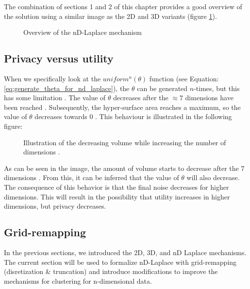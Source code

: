 The combination of sections 1 and 2 of this chapter provides a good overview of the solution using a similar image as the 2D and 3D variants (figure \ref{fig:nd-laplace-overview}).
\begin{figure}[H]
   \centering
  
  \caption{Overview of the nD-Laplace mechanism}
  \label{fig:nd-laplace-overview}
\end{figure}
\newpage
\subsection{Privacy versus utility} \label{theory:privacy-utility-nd}
When we specifically look at the \(uniform^n(\theta)\) function (see Equation: \ref{eq:generate_theta_for_nd_laplace}), the \(\theta\) can be generated \(n\)-times, but this has some limitation \citep{weisstein_hypersphere_nodate}.
The value of \(\theta\) decreases after the $\approx 7$ dimensions have been reached \citep{wells_penguin_1997}. Subsequently, the hyper-surface area reaches a maximum, so the value of $\theta$ decreases towards 0 \citep{weisstein_hypersphere_nodate}.
This behaviour is illustrated in the following figure:
\begin{figure}[H]
\centering
  
  \caption{Illustration of the decreasing volume while increasing the number of dimensions \citep{weisstein_hypersphere_nodate}.}
  \label{fig:curse-of-dimensionality}
\end{figure}
As can be seen in the image, the amount of volume starts to decrease after the 7 dimensions . From this, it can be inferred that the value of  $\theta$ will also decrease. 
The consequence of this behavior is that the final noise decreases for higher dimensions. This will result in the possibility that utility increases in higher dimensions, but privacy decreases.

\newpage
\subsection{Grid-remapping}
In the previous sections, we introduced the 2D, 3D, and nD Laplace mechanisms.
The current section will be used to formalize nD-Laplace with grid-remapping (disretization \& truncation) and introduce modifications to improve the mechanisms for clustering for n-dimensional data.

